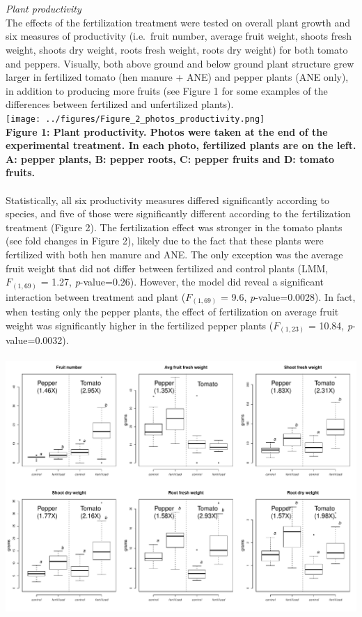 \documentclass[11pt,]{article}
\begin{document}
~\\
\hspace*{0.333em}\\
\emph{Plant productivity}\\
The effects of the fertilization treatment were tested on overall plant
growth and six measures of productivity (i.e.~fruit number, average
fruit weight, shoots fresh weight, shoots dry weight, roots fresh
weight, roots dry weight) for both tomato and peppers. Visually, both
above ground and below ground plant structure grew larger in fertilized
tomato (hen manure + ANE) and pepper plants (ANE only), in addition to
producing more fruits (see Figure 1 for some examples of the differences
between fertilized and unfertilized plants). ~\\
\texttt{[image: ../figures/Figure\_2\_photos\_productivity.png]}\\
\textbf{Figure 1: Plant productivity. Photos were taken at the end of
the experimental treatment. In each photo, fertilized plants are on the
left. A: pepper plants, B: pepper roots, C: pepper fruits and D: tomato
fruits.}\\
\hspace*{0.333em}\\
Statistically, all six productivity measures differed significantly
according to species, and five of those were significantly different
according to the fertilization treatment (Figure 2). The fertilization
effect was stronger in the tomato plants (see fold changes in Figure 2),
likely due to the fact that these plants were fertilized with both hen
manure and ANE. The only exception was the average fruit weight that did
not differ between fertilized and control plants (LMM, \(F_{(1,69)}\) =
1.27, \emph{p}-value=0.26). However, the model did reveal a significant
interaction between treatment and plant (\(F_{(1,69)}\) = 9.6,
\emph{p}-value=0.0028). In fact, when testing only the pepper plants,
the effect of fertilization on average fruit weight was significantly
higher in the fertilized pepper plants (\(F_{(1,23)}\) = 10.84,
\emph{p}-value=0.0032).\\
\hspace*{0.333em}\\
\includegraphics[width=6.25000in]{../figures/Figure_3_productivity.pdf}\\
\end{document}
